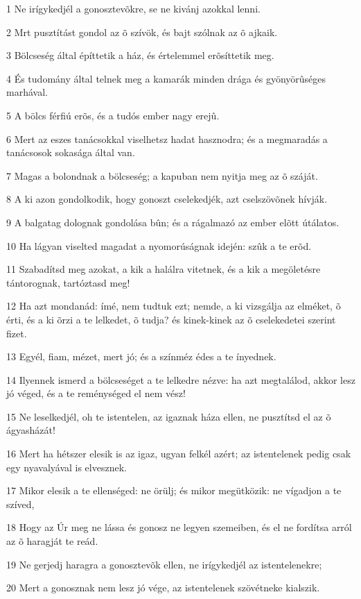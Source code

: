 \par 1 Ne irígykedjél a gonosztevõkre, se ne kivánj azokkal lenni.
\par 2 Mrt pusztítást gondol az õ szívök, és bajt szólnak az õ ajkaik.
\par 3 Bölcseség által építtetik a ház, és értelemmel erõsíttetik meg.
\par 4 És tudomány által telnek meg a kamarák minden drága és gyönyörûséges marhával.
\par 5 A bölcs férfiú erõs, és a tudós ember nagy erejû.
\par 6 Mert az eszes tanácsokkal viselhetsz hadat hasznodra; és a megmaradás a tanácsosok sokasága által van.
\par 7 Magas a bolondnak a bölcseség; a kapuban nem nyitja meg az õ száját.
\par 8 A ki azon gondolkodik, hogy gonoszt cselekedjék, azt cselszövõnek hívják.
\par 9 A balgatag dolognak gondolása bûn; és a rágalmazó az ember elõtt útálatos.
\par 10 Ha lágyan viselted magadat a nyomorúságnak idején: szûk a te erõd.
\par 11 Szabadítsd meg azokat, a kik a halálra vitetnek, és a kik a megöletésre tántorognak, tartóztasd meg!
\par 12 Ha azt mondanád: ímé, nem tudtuk ezt; nemde, a ki vizsgálja az elméket, õ érti, és a ki õrzi a te lelkedet, õ tudja? és kinek-kinek az õ cselekedetei szerint fizet.
\par 13 Egyél, fiam, mézet, mert jó; és a színméz édes a te ínyednek.
\par 14 Ilyennek ismerd a bölcseséget a te lelkedre nézve: ha azt megtalálod, akkor lesz jó véged, és a te reménységed el nem vész!
\par 15 Ne leselkedjél, oh te istentelen, az igaznak háza ellen, ne pusztítsd el az õ ágyasházát!
\par 16 Mert ha hétszer elesik is az igaz, ugyan felkél azért; az istentelenek pedig csak egy nyavalyával is elvesznek.
\par 17 Mikor elesik a te ellenséged: ne örülj; és mikor megütközik: ne vígadjon a te szíved,
\par 18 Hogy az Úr meg ne lássa és gonosz ne legyen szemeiben, és el ne fordítsa arról az õ haragját te reád.
\par 19 Ne gerjedj haragra a gonosztevõk ellen, ne irígykedjél az istentelenekre;
\par 20 Mert a gonosznak nem lesz jó vége, az istentelenek szövétneke kialszik.

